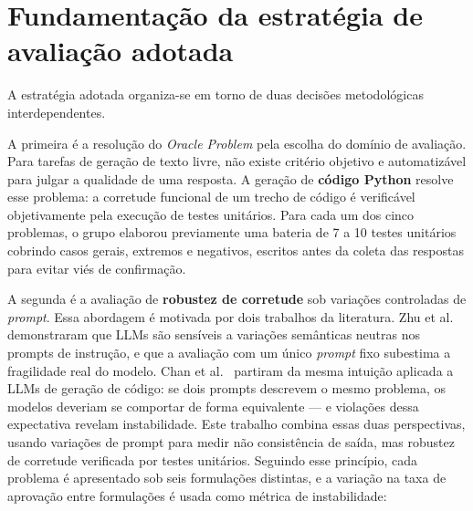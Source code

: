 \documentclass[12pt,
    english,
    french,
    spanish,
    brazil,
    ]{article}
\begin{document}
\section{Fundamentação da estratégia de avaliação adotada}
A estratégia adotada organiza-se em torno de duas decisões metodológicas
interdependentes.

A primeira é a resolução do \textit{Oracle Problem} \cite{barr2015oracle}
pela escolha do domínio de avaliação. Para tarefas de geração de texto livre,
não existe critério objetivo e automatizável para julgar a qualidade de uma
resposta. A geração de \textbf{código Python} resolve esse problema: a
corretude funcional de um trecho de código é verificável objetivamente pela
execução de testes unitários. Para cada um dos cinco problemas, o grupo
elaborou previamente uma bateria de 7 a 10 testes unitários cobrindo casos
gerais, extremos e negativos, escritos antes da coleta das respostas para
evitar viés de confirmação.

A segunda é a avaliação de \textbf{robustez de corretude} sob variações
controladas de \textit{prompt}. Essa abordagem é motivada por dois trabalhos
da literatura. Zhu et al.\ \cite{zhu2023promptrobust} demonstraram que LLMs
são sensíveis a variações semânticas neutras nos prompts de instrução, e que
a avaliação com um único \textit{prompt} fixo subestima a fragilidade real
do modelo. Chan et al.\ \cite{chan2025symmetric} partiram da mesma intuição
aplicada a LLMs de geração de código: se dois prompts descrevem o mesmo
problema, os modelos deveriam se comportar de forma equivalente — e violações
dessa expectativa revelam instabilidade. Este trabalho combina essas duas
perspectivas, usando variações de prompt para medir não consistência de saída,
mas robustez de corretude verificada por testes unitários. Seguindo esse
princípio, cada problema é apresentado sob seis formulações distintas, e a
variação na taxa de aprovação entre formulações é usada como métrica de
instabilidade:
\end{document}
